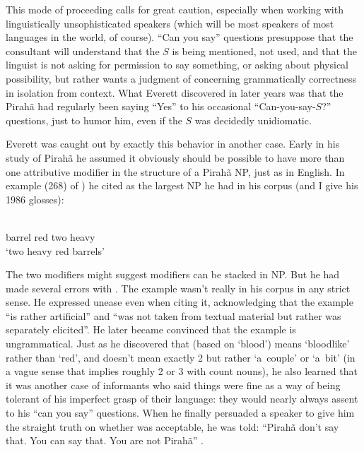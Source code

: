 \documentclass[output=paper,colorlinks,citecolor=brown
]{langscibook}
\begin{document}
This mode of proceeding calls for great caution, especially when
working with linguistically unsophisticated speakers (which will be
most speakers of most languages in the world, of course). ``Can you say''
questions presuppose that the consultant will understand that the $S$
is being mentioned, not used, and that the linguist is not asking
for permission to say something, or asking about physical possibility,
but rather wants a judgment of concerning grammatically correctness
in isolation from context. What Everett discovered in later years was
that the Pirah{\~a} had regularly been saying ``Yes'' to his occasional
``Can-you-say-$S$?'' questions, just to humor him, even if the $S$ was
decidedly unidiomatic.

Everett was caught out by exactly this behavior in another case. Early
in his study of Pirah{\~a} he assumed it obviously should be possible
to have more than one attributive modifier in the structure of a
Pirah{\~a} NP, just as in English. In example (268) of \citet[273]{Everett86HAL}) he cited  as the largest NP he had
in his corpus (and I give his 1986 glosses):

\ea\label{ex:pullum:4}
\gll {}     
      \\
     barrel   red   two   heavy \\
     \glt `two heavy red barrels'
\z

\noindent
The two modifiers might suggest modifiers can be stacked in NP. But
he had made several errors with . The example wasn't really
in his corpus in any strict sense. He expressed unease even when citing
it, acknowledging that the example ``is rather artificial'' and ``was
not taken from textual material but rather was separately elicited''.
He later became convinced that the example is ungrammatical. Just
as he discovered that  (based on 
`blood') means `bloodlike' rather than `red', and 
doesn't mean exactly 2 but rather `a~couple' or `a~bit' (in a vague
sense that implies roughly 2 or 3 with count nouns), he also learned
that it was another case of informants who said things were fine as
a way of being tolerant of his imperfect grasp of their language:
they would nearly always assent to his ``can you say'' questions. When
he finally persuaded a speaker to give him the straight truth on
whether  was acceptable, he was told: ``Pirah{\~a} don't
say that.  You can say that. You are not Pirah{\~a}''
\citep[422]{Everett09}.
\end{document}
